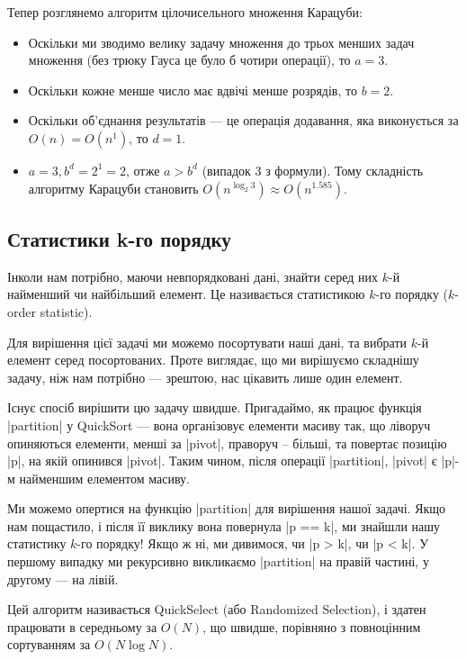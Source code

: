 \documentclass[12pt,a4paper]{report}
\begin{document}
Тепер розглянемо алгоритм цілочисельного множення Карацуби:

\begin{itemize}
    \item Оскільки ми зводимо велику задачу множення до трьох менших задач множення (без трюку Гауса це було б чотири операції), то \(a = 3\).
    \item Оскільки кожне менше число має вдвічі менше розрядів, то \(b = 2\).
    \item Оскільки об’єднання результатів --- це операція додавання, яка виконується за \(O(n) = O(n ^ 1)\), то \(d = 1\).
    \item \(a = 3, b ^ d = 2 ^ 1 = 2\), отже \(a > b ^ d\) (випадок 3 з формули). Тому складність алгоритму Карацуби становить \(O(n ^ {\log_2 3}) \approx O(n ^ {1.585}) \).
\end{itemize}


\subsection{Статистики k-го порядку}

Інколи нам потрібно, маючи невпорядковані дані, знайти серед них \(k\)-й найменший чи найбільший елемент. Це називається статистикою \(k\)-го порядку (\(k\)-order statistic).

Для вирішення цієї задачі ми можемо посортувати наші дані, та вибрати \(k\)-й елемент серед посортованих. Проте виглядає, що ми вирішуємо складнішу задачу, ніж нам потрібно --- зрештою, нас цікавить лише один елемент.

Існує спосіб вирішити цю задачу швидше. Пригадаймо, як працює функція |partition| у QuickSort --- вона організовує елементи масиву так, що ліворуч опиняються елементи, менші за |pivot|, праворуч -- більші, та повертає позицію |p|, на якій опинився |pivot|. Таким чином, після операції |partition|, |pivot| є |p|-м найменшим елементом масиву.

Ми можемо опертися на функцію |partition| для вирішення нашої задачі. Якщо нам пощастило, і після її виклику вона повернула |p == k|, ми знайшли нашу статистику \(k\)-го порядку! Якщо ж ні, ми дивимося, чи |p > k|, чи |p < k|. У першому випадку ми рекурсивно викликаємо |partition| на правій частині, у другому --- на лівій.

Цей алгоритм називається QuickSelect (або Randomized Selection), і здатен працювати в середньому за \(O(N)\), що швидше, порівняно з повноцінним сортуванням за \(O(N \log N)\).
\end{document}

